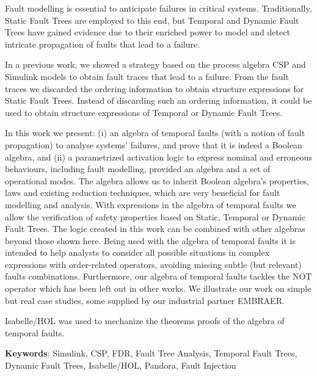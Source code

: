 \documentclass[12pt,openright,twoside,a4paper,oldfontcommands,english,brazil,final]{abntex2}
\theoremstyle{theo}
\begin{document}

\begin{resumo}
Fault modelling is essential to anticipate failures in critical systems.
Traditionally, Static Fault Trees are employed to this end, but Temporal and Dynamic Fault Trees have gained evidence due to their enriched power to model and detect intricate propagation of faults that lead to a failure.

In a previous work, we showed a strategy based on the process algebra CSP and Simulink models to obtain fault traces that lead to a failure.
From the fault traces we discarded the ordering information to obtain structure expressions for Static Fault Trees.
Instead of discarding such an ordering information, it could be used to obtain structure expressions of Temporal or Dynamic Fault Trees.

In this work we present: (i) an algebra of temporal faults (with a notion of fault propagation) to analyse systems' failures, and prove that it is indeed a Boolean algebra, and (ii) a parametrized activation logic to express nominal and erroneous behaviours, including fault modelling, provided an algebra and a set of operational modes.
The algebra allows us to inherit Boolean algebra's properties, laws and existing reduction techniques, which are very beneficial for fault modelling and analysis.
With expressions in the algebra of temporal faults we allow the verification of safety properties based on Static, Temporal or Dynamic Fault Trees.
The logic created in this work can be combined with other algebras beyond those shown here.
Being used with the algebra of temporal faults it is intended to help analysts to consider all possible situations in complex expressions with order-related operators, avoiding missing subtle (but relevant) faults combinations.
Furthermore, our algebra of temporal faults tackles the NOT operator which has been left out in other works.
We illustrate our work on simple but real case studies, some supplied by our industrial partner EMBRAER.

Isabelle/HOL was used to mechanize the theorems proofs of the algebra of temporal faults.

\vspace{\onelineskip}
\noindent
\textbf{Keywords}: Simulink, CSP, FDR, Fault Tree Analysis, Temporal Fault Trees, Dynamic Fault Trees, Isabelle/HOL, Pandora, Fault Injection
\end{resumo}
\end{document}
